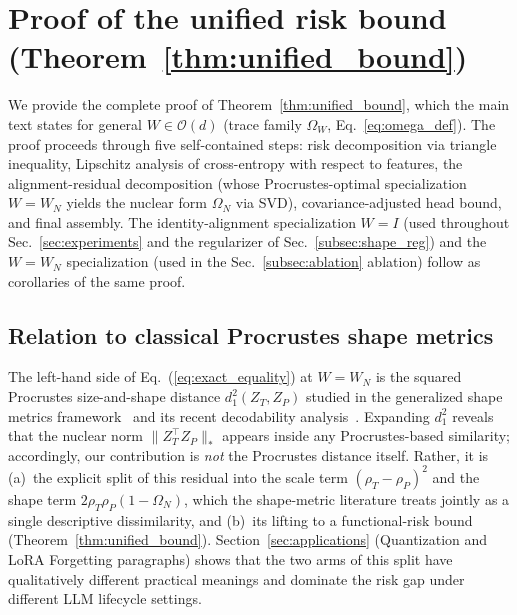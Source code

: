 

\section{Proof of the unified risk bound (Theorem~\ref{thm:unified_bound})}
\label{app:detailed_proofs}

We provide the complete proof of Theorem~\ref{thm:unified_bound}, which the main text states for general $W \in \mathcal{O}(d)$ (trace family $\Omega_W$, Eq.~\ref{eq:omega_def}). The proof proceeds through five self-contained steps: risk decomposition via triangle inequality, Lipschitz analysis of cross-entropy with respect to features, the alignment-residual decomposition (whose Procrustes-optimal specialization $W = W_N$ yields the nuclear form $\Omega_N$ via SVD), covariance-adjusted head bound, and final assembly. The identity-alignment specialization $W = I$ (used throughout Sec.~\ref{sec:experiments} and the regularizer of Sec.~\ref{subsec:shape_reg}) and the $W = W_N$ specialization (used in the Sec.~\ref{subsec:ablation} ablation) follow as corollaries of the same proof.

\subsection{Relation to classical Procrustes shape metrics}
\label{app:shape_metrics_relation}

The left-hand side of Eq.~(\ref{eq:exact_equality}) at $W = W_N$ is the squared Procrustes size-and-shape distance $d_1^2(Z_T, Z_P)$ studied in the generalized shape metrics framework~\citep{williams2021generalized} and its recent decodability analysis~\citep{harvey2024what}. Expanding $d_1^2$ reveals that the nuclear norm $\|Z_T^\top Z_P\|_*$ appears inside any Procrustes-based similarity; accordingly, our contribution is \emph{not} the Procrustes distance itself. Rather, it is (a)~the explicit split of this residual into the scale term $(\rho_T-\rho_P)^2$ and the shape term $2\rho_T\rho_P(1-\Omega_N)$, which the shape-metric literature treats jointly as a single descriptive dissimilarity, and (b)~its lifting to a functional-risk bound (Theorem~\ref{thm:unified_bound}). Section~\ref{sec:applications} (Quantization and LoRA Forgetting paragraphs) shows that the two arms of this split have qualitatively different practical meanings and dominate the risk gap under different LLM lifecycle settings.


